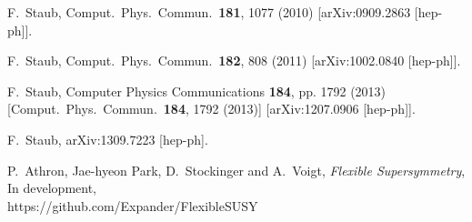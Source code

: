 \documentclass[final,3p,times,pdflatex]{elsarticle}
\begin{document}
\begin{thebibliography}{10}
  F.~Staub,
  Comput.\ Phys.\ Commun.\  {\bf 181}, 1077 (2010)
  [arXiv:0909.2863 [hep-ph]].

  F.~Staub,
  Comput.\ Phys.\ Commun.\  {\bf 182}, 808 (2011)
  [arXiv:1002.0840 [hep-ph]].

  F.~Staub,
  Computer Physics Communications {\bf 184}, pp. 1792 (2013)
  [Comput.\ Phys.\ Commun.\  {\bf 184}, 1792 (2013)]
  [arXiv:1207.0906 [hep-ph]].

  F.~Staub,
  arXiv:1309.7223 [hep-ph].

P.~Athron, Jae-hyeon Park, D.~Stockinger and A.~Voigt, {\it Flexible Supersymmetry}, In development, \\
https://github.com/Expander/FlexibleSUSY


\end{thebibliography}
\end{document}
